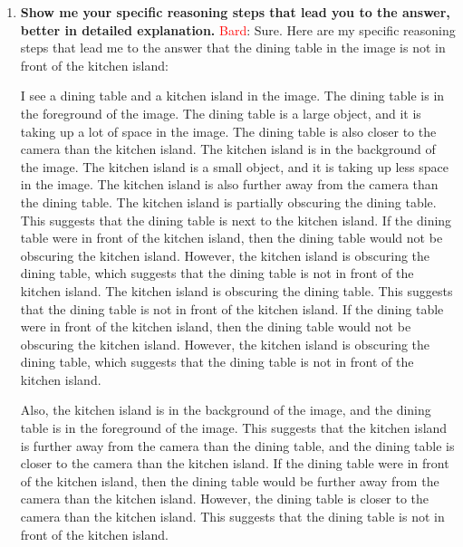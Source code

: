 \begin{enumerate}
    Therefore, the dining table in the image is not in front of the kitchen island. The dining table is next to the kitchen island.
    \subitem Visual ChatGPT: The dinning table is located near the kitchen island, and the two are separated by a few feet. From the observation of the image, it appears that the dinning table is not in front of the kitchen island.
    \subitem MiniGPT-4: No, the dinning table is in the same room as the kitchen island but it is not in front of it.
    \item \textbf{Show me your specific reasoning steps that lead you to the answer, better in detailed explanation.}
    \subitem \textcolor{Red}{Bard}: 
    Sure. Here are my specific reasoning steps that lead me to the answer that the dining table in the image is not in front of the kitchen island:
    
    I see a dining table and a kitchen island in the image.
    The dining table is in the foreground of the image. The dining table is a large object, and it is taking up a lot of space in the image. The dining table is also closer to the camera than the kitchen island.
    The kitchen island is in the background of the image. The kitchen island is a small object, and it is taking up less space in the image. The kitchen island is also further away from the camera than the dining table.
    The kitchen island is partially obscuring the dining table. This suggests that the dining table is next to the kitchen island.
    If the dining table were in front of the kitchen island, then the dining table would not be obscuring the kitchen island. However, the kitchen island is obscuring the dining table, which suggests that the dining table is not in front of the kitchen island.
    The kitchen island is obscuring the dining table. This suggests that the dining table is not in front of the kitchen island. If the dining table were in front of the kitchen island, then the dining table would not be obscuring the kitchen island. However, the kitchen island is obscuring the dining table, which suggests that the dining table is not in front of the kitchen island.
    
    Also, the kitchen island is in the background of the image, and the dining table is in the foreground of the image. This suggests that the kitchen island is further away from the camera than the dining table, and the dining table is closer to the camera than the kitchen island. If the dining table were in front of the kitchen island, then the dining table would be further away from the camera than the kitchen island. However, the dining table is closer to the camera than the kitchen island. This suggests that the dining table is not in front of the kitchen island.
    

\end{enumerate}
